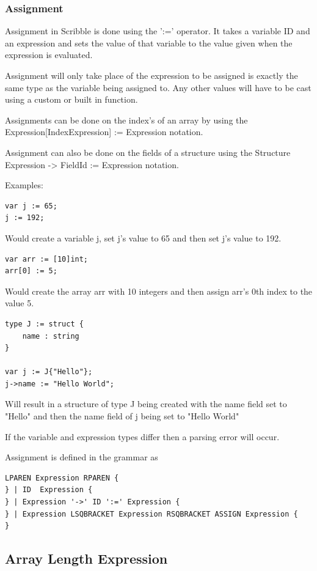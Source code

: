 \documentclass[]{final_report}
\begin{document}
\subsubsection{Assignment}

Assignment in Scribble is done using the ':=' operator. It takes a variable ID and an expression and sets the value of that variable to the value given when the expression is evaluated.

Assignment will only take place of the expression to be assigned is exactly the same type as the variable being assigned to. Any other values will have to be cast using a custom or built in function.

Assignments can be done on the index's of an array by using the Expression[IndexExpression] := Expression notation.

Assignment can also be done on the fields of a structure using the Structure Expression -> FieldId := Expression notation. 

Examples: \begin{verbatim}
var j := 65;
j := 192;
\end{verbatim}

Would create a variable j, set j's value to 65 and then set j's value to 192.

\begin{verbatim}
var arr := [10]int;
arr[0] := 5;
\end{verbatim}

Would create the array arr with 10 integers and then assign arr's 0th index to the value 5.

\begin{verbatim}
type J := struct {
	name : string
}

var j := J{"Hello"};
j->name := "Hello World";
\end{verbatim}
Will result in a structure of type J being created with the name field set to "Hello" and then the name field of j being set to "Hello World"

If the variable and expression types differ then a parsing error will occur.

Assignment is defined in the grammar as
\begin{verbatim}
LPAREN Expression RPAREN {
} | ID  Expression {
} | Expression '->' ID ':=' Expression {
} | Expression LSQBRACKET Expression RSQBRACKET ASSIGN Expression {
} 
\end{verbatim}

\subsection{Array Length Expression}
\end{document}
